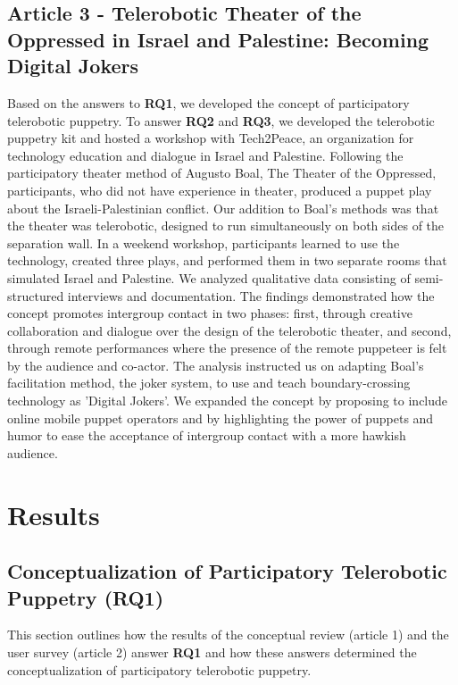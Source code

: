 \documentclass[dissertation,math,vertlayout,pdfa,colorlinks,nologo]{aaltoseries}
\begin{document}
\section{Article 3 - Telerobotic Theater of the Oppressed in Israel and Palestine: Becoming Digital Jokers}
Based on the answers to \textbf{RQ1}, we developed the concept of participatory telerobotic puppetry. To answer \textbf{RQ2} and \textbf{RQ3}, we developed the telerobotic puppetry kit and hosted a workshop with Tech2Peace, an organization for technology education and dialogue in Israel and Palestine. Following the participatory theater method of Augusto Boal, The Theater of the Oppressed, participants, who did not have experience in theater, produced a puppet play about the Israeli-Palestinian conflict. Our addition to Boal's methods was that the theater was telerobotic, designed to run simultaneously on both sides of the separation wall. In a weekend workshop, participants learned to use the technology, created three plays, and performed them in two separate rooms that simulated Israel and Palestine. We analyzed qualitative data consisting of semi-structured interviews and documentation. The findings demonstrated how the concept promotes intergroup contact in two phases: first, through creative collaboration and dialogue over the design of the telerobotic theater, and second, through remote performances where the presence of the remote puppeteer is felt by the audience and co-actor. The analysis instructed us on adapting Boal's facilitation method, the joker system, to use and teach boundary-crossing technology as 'Digital Jokers'. We expanded the concept by proposing to include online mobile puppet operators and by highlighting the power of puppets and humor to ease the acceptance of intergroup contact with a more hawkish audience.  
% 
\chapter{Results}

\section{Conceptualization of Participatory Telerobotic Puppetry (RQ1)}
This section outlines how the results of the conceptual review (article 1) and the user survey (article 2) answer \textbf{RQ1} and how these answers determined the conceptualization of participatory telerobotic puppetry.
\end{document}
